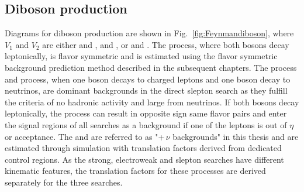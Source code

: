 \subsection*{Diboson production}
\noindent
\justify
Diagrams for diboson production are shown in Fig.~\ref{fig:Feynmandiboson}, where $V_1$ and $V_2$ are either \PW and \PW, \PZ and \PZ, or \PW and \PZ. 
The \PWW process, where both \PW bosons decay leptonically, is flavor symmetric and is estimated using the flavor symmetric background prediction method described in the subsequent chapters. 
The \PZZ process and \PWZ process, when one \PZ boson decays to charged leptons and one \PZ boson decay to neutrinos, are dominant backgrounds in the direct slepton search as they fulfill the criteria of no hadronic activity and large \ptmiss from neutrinos. 
If both bosons decay leptonically, the \PWZ process can result in opposite sign same flavor pairs and enter the signal regions of all searches as a background if one of the leptons is out of $\eta$ or \pt acceptance. 
The \PZZ and \PWZ are referred to as "\PZ+$\,\nu$ backgrounds" in this thesis and are estimated through simulation with translation factors derived from dedicated control regions. 
As the strong, electroweak and slepton searches have different kinematic features, the translation factors for these processes are derived separately for the three searches.
